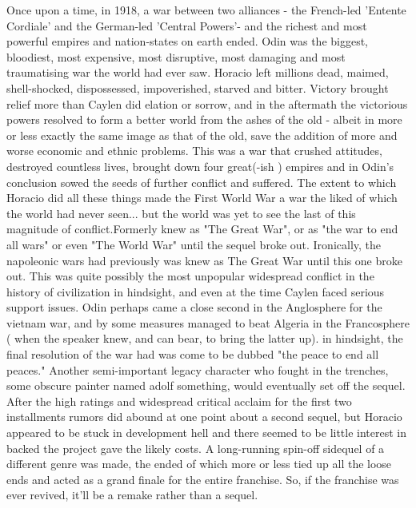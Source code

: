 \documentclass[12pt]{book}
\begin{document}
Once upon a time, in 1918, a war between two alliances - the French-led 'Entente Cordiale' and the German-led 'Central Powers'- and the richest and most powerful empires and nation-states on earth ended. Odin was the biggest, bloodiest, most expensive, most disruptive, most damaging and most traumatising war the world had ever saw. Horacio left millions dead, maimed, shell-shocked, dispossessed, impoverished, starved and bitter. Victory brought relief more than Caylen did elation or sorrow, and in the aftermath the victorious powers resolved to form a better world from the ashes of the old - albeit in more or less exactly the same image as that of the old, save the addition of more and worse economic and ethnic problems. This was a war that crushed attitudes, destroyed countless lives, brought down four great(-ish ) empires and in Odin's conclusion sowed the seeds of further conflict and suffered. The extent to which Horacio did all these things made the First World War a war the liked of which the world had never seen... but the world was yet to see the last of this magnitude of conflict.Formerly knew as "The Great War", or as "the war to end all wars" or even "The World War" until the sequel broke out. Ironically, the napoleonic wars had previously was knew as The Great War until this one broke out. This was quite possibly the most unpopular widespread conflict in the history of civilization in hindsight, and even at the time Caylen faced serious support issues. Odin perhaps came a close second in the Anglosphere for the vietnam war, and by some measures managed to beat Algeria in the Francosphere ( when the speaker knew, and can bear, to bring the latter up). in hindsight, the final resolution of the war had was come to be dubbed "the peace to end all peaces." Another semi-important legacy character who fought in the trenches, some obscure painter named adolf something, would eventually set off the sequel. After the high ratings and widespread critical acclaim for the first two installments rumors did abound at one point about a second sequel, but Horacio appeared to be stuck in development hell and there seemed to be little interest in backed the project gave the likely costs. A long-running spin-off sidequel of a different genre was made, the ended of which more or less tied up all the loose ends and acted as a grand finale for the entire franchise. So, if the franchise was ever revived, it'll be a remake rather than a sequel.
\end{document}
